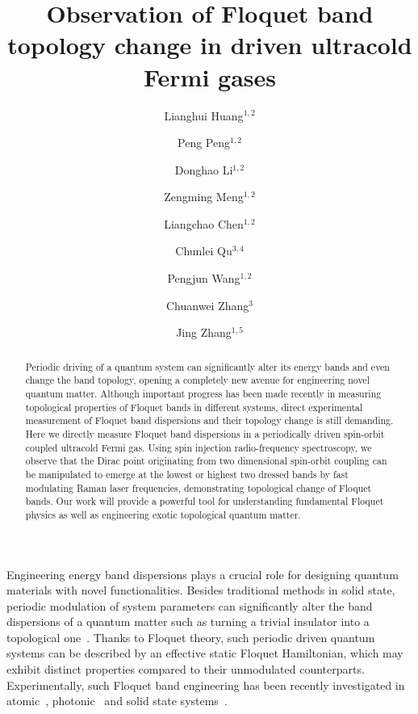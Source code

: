 \documentclass[aps,prl,twocolumn,floatfix,reprint]{revtex4}
\begin{document}
\title{Observation of Floquet band topology change in driven ultracold Fermi
gases}
\author{Lianghui Huang$^{1,2}$}
\author{Peng Peng$^{1,2}$}
\author{Donghao Li$^{1,2}$}
\author{Zengming Meng$^{1,2}$}
\author{Liangchao Chen$^{1,2}$}
\author{Chunlei Qu$^{3,4}$}
\author{Pengjun Wang$^{1,2}$}
\author{Chuanwei Zhang$^{3}$}
\author{Jing Zhang$^{1,5}$}

\begin{abstract}
Periodic driving of a quantum system can significantly alter its energy
bands and even change the band topology, opening a completely new avenue for
engineering novel quantum matter. Although important progress has been made
recently in measuring topological properties of Floquet bands in different
systems, direct experimental measurement of Floquet band dispersions and
their topology change is still demanding. Here we directly measure Floquet
band dispersions in a periodically driven spin-orbit coupled ultracold Fermi
gas. Using spin injection radio-frequency spectroscopy, we observe that the
Dirac point originating from two dimensional spin-orbit coupling can be
manipulated to emerge at the lowest or highest two dressed bands by fast
modulating Raman laser frequencies, demonstrating topological change of
Floquet bands. Our work will provide a powerful tool for understanding
fundamental Floquet physics as well as engineering exotic topological
quantum matter.
\end{abstract}

\maketitle

Engineering energy band dispersions plays a crucial role for designing
quantum materials with novel functionalities. Besides traditional methods in
solid state, periodic modulation of system parameters can significantly
alter the band dispersions of a quantum matter such as turning a trivial
insulator into a topological one~\cite{Linder2011}. Thanks to Floquet
theory, such periodic driven quantum systems can be described by an
effective static Floquet Hamiltonian, which may exhibit distinct properties
compared to their unmodulated counterparts. Experimentally, such Floquet
band engineering has been recently investigated in atomic~\cite%
{Aidelsburger2013,Miyake2013}, photonic~\cite{Rechtsman2013} and solid state
systems~\cite{Wang2013}.
\end{document}
